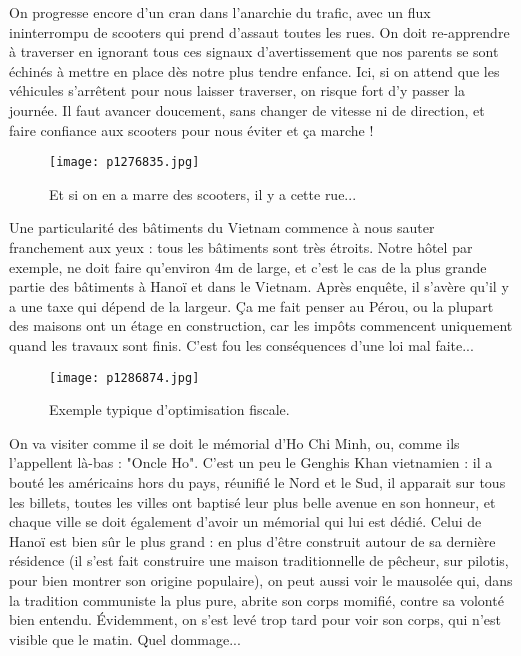 \documentclass{book}
\begin{document}
On progresse encore d'un cran dans l'anarchie du trafic, avec un flux ininterrompu de scooters qui prend d'assaut toutes les rues. On doit re-apprendre à traverser en ignorant tous ces signaux d'avertissement que nos parents se sont échinés à mettre en place dès notre plus tendre enfance. Ici, si on attend que les véhicules s'arrêtent pour nous laisser traverser, on risque fort d'y passer la journée. Il faut avancer doucement, sans changer de vitesse ni de direction, et faire confiance aux scooters pour nous éviter et ça marche !


\begin{figure}[h]
\centering
\texttt{[image: p1276835.jpg]}
\caption*{Et si on en a marre des scooters, il y a cette rue...}
\end{figure}

Une particularité des bâtiments du Vietnam commence à nous sauter franchement aux yeux : tous les bâtiments sont très étroits. Notre hôtel par exemple, ne doit faire qu'environ 4m de large, et c'est le cas de la plus grande partie des bâtiments à Hanoï et dans le Vietnam. Après enquête, il s'avère qu'il y a une taxe qui dépend de la largeur. Ça me fait penser au Pérou, ou la plupart des maisons ont un étage en construction, car les impôts commencent uniquement quand les travaux sont finis. C'est fou les conséquences d'une loi mal faite...


\begin{wrapfigure}{l}{0.55\textwidth}
\centering
\texttt{[image: p1286874.jpg]}
\caption*{Exemple typique d'optimisation fiscale.}
\end{wrapfigure}

On va visiter comme il se doit le mémorial d'Ho Chi Minh, ou, comme ils l'appellent là-bas : "Oncle Ho". C'est un peu le Genghis Khan vietnamien : il a bouté les américains hors du pays, réunifié le Nord et le Sud, il apparait sur tous les billets, toutes les villes ont baptisé leur plus belle avenue en son honneur, et chaque ville se doit également d'avoir un mémorial qui lui est dédié. Celui de Hanoï est bien sûr le plus grand : en plus d'être construit autour de sa dernière résidence (il s'est fait construire une maison traditionnelle de pêcheur, sur pilotis, pour bien montrer son origine populaire), on peut aussi voir le mausolée qui, dans la tradition communiste la plus pure, abrite son corps momifié, contre sa volonté bien entendu. Évidemment, on s'est levé trop tard pour voir son corps, qui n'est visible que le matin. Quel dommage...
\end{document}
